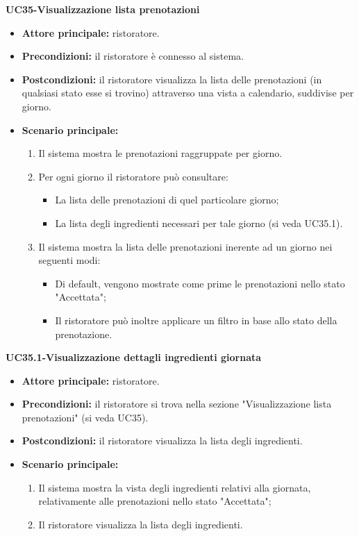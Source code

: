 \textbf{UC35-Visualizzazione lista prenotazioni}
\begin{itemize}
\item \textbf{Attore principale:} ristoratore.
\item \textbf{Precondizioni:} il ristoratore è connesso al sistema.
\item \textbf{Postcondizioni:} il ristoratore visualizza la lista delle prenotazioni (in qualsiasi stato esse si trovino) attraverso una vista a calendario, suddivise per giorno.
\item \textbf{Scenario principale:}
\begin{enumerate}
    \item Il sistema mostra le prenotazioni raggruppate per giorno.
    \item Per ogni giorno il ristoratore può consultare:
    \begin{itemize}
        \item La lista delle prenotazioni di quel particolare giorno;
        \item La lista degli ingredienti necessari per tale giorno (si veda UC35.1).
    \end{itemize}
    \item Il sistema mostra la lista delle prenotazioni inerente ad un giorno nei seguenti modi:
    \begin{itemize}
        \item Di default, vengono mostrate come prime le prenotazioni nello stato "Accettata";
        \item Il ristoratore può inoltre applicare un filtro in base allo stato della prenotazione.
    \end{itemize}
\end{enumerate}
\end{itemize}

\textbf{UC35.1-Visualizzazione dettagli ingredienti giornata}
\begin{itemize}
\item \textbf{Attore principale:} ristoratore.
\item \textbf{Precondizioni:} il ristoratore si trova nella sezione "Visualizzazione lista prenotazioni" (si veda UC35).
\item \textbf{Postcondizioni:} il ristoratore visualizza la lista degli ingredienti.
\item \textbf{Scenario principale:}
\begin{enumerate}
    \item Il sistema mostra la vista degli ingredienti relativi alla giornata, relativamente alle prenotazioni nello stato "Accettata";
    \item Il ristoratore visualizza la lista degli ingredienti.
\end{enumerate}
\end{itemize}


